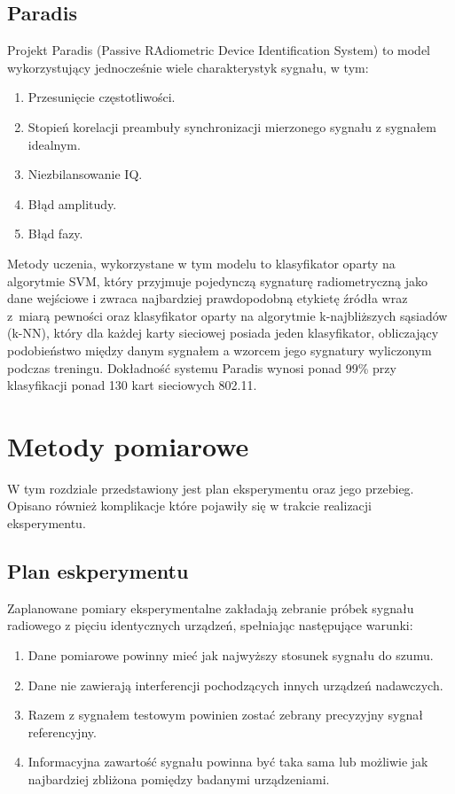 \subsection{Paradis}
Projekt Paradis (Passive RAdiometric Device Identification System) \cite{10.1145/1409944.1409959} to model wykorzystujący jednocześnie wiele charakterystyk sygnału, w tym:
\begin{enumerate}
    \item Przesunięcie częstotliwości.
    \item Stopień korelacji preambuły synchronizacji mierzonego sygnału z sygnałem idealnym.
    \item Niezbilansowanie IQ.
    \item Błąd amplitudy.
    \item Błąd fazy.
\end{enumerate}
Metody uczenia, wykorzystane w tym modelu to klasyfikator oparty na algorytmie SVM, który przyjmuje pojedynczą sygnaturę radiometryczną jako dane wejściowe i zwraca najbardziej prawdopodobną etykietę źródła wraz z~miarą pewności oraz klasyfikator oparty na algorytmie k-najbliższych sąsiadów (k-NN), który dla każdej karty sieciowej posiada jeden klasyfikator, obliczający podobieństwo między danym sygnałem a wzorcem jego sygnatury wyliczonym podczas treningu.
Dokładność systemu Paradis wynosi ponad 99\% przy klasyfikacji ponad 130 kart sieciowych 802.11.




\section{Metody pomiarowe}
W tym rozdziale przedstawiony jest plan eksperymentu oraz jego przebieg. Opisano również komplikacje które pojawiły się w trakcie realizacji eksperymentu.
\subsection{Plan eskperymentu}
Zaplanowane pomiary eksperymentalne zakładają zebranie próbek sygnału radiowego z pięciu identycznych urządzeń, spełniając następujące warunki:
\begin{enumerate}
    \item Dane pomiarowe powinny mieć jak najwyższy stosunek sygnału do szumu.
    \item Dane nie zawierają interferencji pochodzących innych urządzeń nadawczych.
    \item Razem z sygnałem testowym powinien zostać zebrany precyzyjny sygnał referencyjny.
    \item Informacyjna zawartość sygnału powinna być taka sama lub możliwie jak najbardziej zbliżona pomiędzy badanymi urządzeniami.
\end{enumerate}

